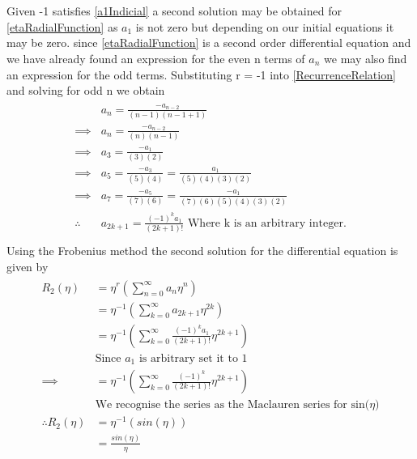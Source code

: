 \documentclass[10pt]{article}
\numberwithin{equation}{section}
\begin{document}
		\section{}
		
		Given -1 satisfies \ref{a1Indicial} a second solution may be obtained for \ref{etaRadialFunction} as \(a_1\) is not zero but depending on our initial equations it may be zero.
		since \ref{etaRadialFunction} is a second order differential equation and we have already found an expression for the even n terms of \(a_n\) we may also find an expression for the odd terms.
		Substituting r = -1 into \ref{RecurrenceRelation} and solving for odd n we obtain
		\begin{align}\label{oddAk}
			\begin{split}
				&a_n = \frac{-a_{n-2}}{(n-1)(n-1+1)}\\
				\implies&a_n = \frac{-a_{n-2}}{(n)(n-1)}\\
				\implies&a_3 = \frac{-a_{1}}{(3)(2)} \\
				\implies&a_5 = \frac{-a_{3}}{(5)(4)} = \frac{a_{1}}{(5)(4)(3)(2)}\\
				\implies&a_7 = \frac{-a_{5}}{(7)(6)} = \frac{-a_{1}}{(7)(6)(5)(4)(3)(2)}\\
				\therefore\quad&a_{2k+1} = \frac{(-1)^{k}a_{1}}{(2k +1)!}
				\text{   Where k is an arbitrary integer.}\\
			\end{split}
		\end{align}
		Using the Frobenius method the second solution for the differential equation is given by
		\begin{align}
			\begin{split}
				R_2(\eta) &= \eta^r\left(\sum_{n=0}^{\infty}a_{n}\eta^n\right)\\
				&= \eta^{-1}\left(\sum_{k=0}^{\infty}a_{2k+1}\eta^{2k}\right)\\
				&= \eta^{-1}\left(\sum_{k=0}^{\infty}\frac{(-1)^{k}a_{1}}{(2k+1)!}\eta^{2k+1}\right)\\
				&\text{Since \(a_1\) is arbitrary set it to 1}\\
				\implies&= \eta^{-1}\left(\sum_{k=0}^{\infty}\frac{(-1)^{k}}{(2k+1)!}\eta^{2k+1}\right)\\
				&\text{We recognise the series as the Maclauren series for sin(\(\eta\))}\\
				\therefore R_2(\eta) & = \eta^{-1}\left(sin(\eta)\right)\\
				&= \frac{sin(\eta)}{\eta} 
			\end{split}
		\end{align}
\end{document}
